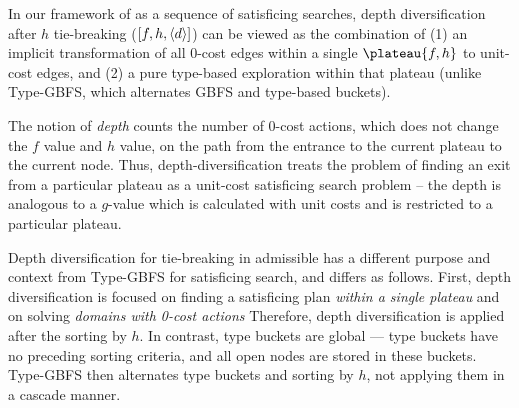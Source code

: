 
In our framework of \astar as a sequence of satisficing searches, depth diversification after $h$ tie-breaking ($[f,h,{\left<d\right>}]$) can be viewed as the combination of (1) an implicit transformation of all 0-cost edges within a single $\plateau{f,h}$ to unit-cost edges, and (2) a pure type-based exploration within that plateau (unlike Type-GBFS, which alternates GBFS and type-based buckets).
 
The notion of \emph{depth} counts the number of 0-cost actions, which does not change the $f$ value and $h$
value, on the path from the entrance to the current plateau to the current node.  Thus, 
depth-diversification treats  the problem of finding an exit from a particular plateau as a unit-cost satisficing search problem
-- the depth is analogous to a $g$-value which is calculated with unit costs and is restricted to a particular plateau.

Depth diversification for tie-breaking in admissible \astar has a different purpose and context from Type-GBFS for satisficing search,
and differs as follows.
First, depth diversification  is focused on finding a satisficing plan \emph{within a single plateau} and on solving \emph{domains with 0-cost actions} %
Therefore, depth diversification is applied after the sorting by $h$.
In contrast, type buckets are global --- type buckets have no preceding sorting criteria, and all open nodes are stored in these buckets. Type-GBFS then alternates type buckets and sorting by $h$, not applying them in a cascade manner.

